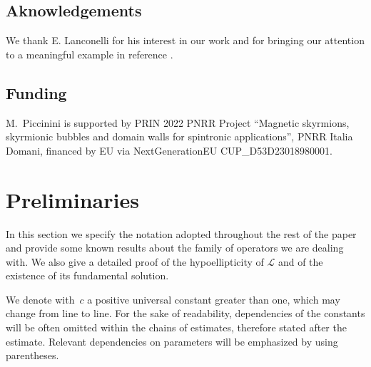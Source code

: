 \documentclass{amsart}
\numberwithin{equation}{section}
\def \Lc{{\mathcal{L}}}
\begin{document}
{\subsection*{Aknowledgements} We thank E. Lanconelli for his interest in our work and for bringing our attention to a meaningful example in reference \cite{Luk74}.

\subsection*{Funding} M.~Piccinini is supported by PRIN 2022 PNRR Project ``Magnetic skyrmions, skyrmionic bubbles and domain walls for spintronic applications'', PNRR Italia Domani, financed by EU via NextGenerationEU CUP\_D53D23018980001.



\section{Preliminaries}\label{sec:2}
In this section we specify the notation adopted throughout the rest of the paper and provide some known results about the family of operators we are dealing with. We also give a detailed proof of the hypoellipticity of $\Lc$ and of the existence of its fundamental solution.


{
We denote with~$c$ a positive universal constant greater than one, which may change from line to line. For the sake of readability, dependencies of the constants will be often omitted within the chains of estimates, therefore stated after the estimate. Relevant dependencies on parameters will be emphasized by using parentheses.

}}
\end{document}
